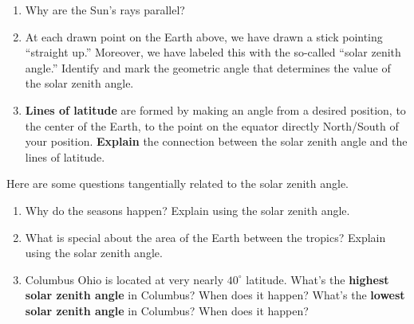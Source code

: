\documentclass[noauthor,nooutcomes,handout,hints,12pt]{ximera}
\begin{document}
\begin{question}
\begin{center}
  \end{center}
  \begin{enumerate}
  \item Why are the Sun's rays parallel?
  \item At each drawn point on the Earth above, we have drawn a stick
    pointing ``straight up.'' Moreover, we have labeled this with the
    so-called ``solar zenith angle.'' Identify and mark the geometric
    angle that determines the value of the solar zenith angle.
  \item \textbf{Lines of latitude} are formed by making an angle from
    a desired position, to the center of the Earth, to the point on
    the equator directly North/South of your position. \textbf{Explain}
    the connection between the solar zenith angle and the lines of latitude.
  \end{enumerate}
 
\end{question}
\mynewpage




\begin{question}
  Here are some questions tangentially related to the solar zenith angle.
  \begin{enumerate}
  \item Why do the seasons happen? Explain using the solar zenith angle.
  \item What is special about the area of the Earth between the tropics? Explain using the solar zenith angle.
  \item Columbus Ohio is located at very nearly $40^\circ$
    latitude. What's the \textbf{highest solar zenith angle} in
    Columbus? When does it happen? What's the \textbf{lowest
      solar zenith angle} in Columbus? When does it happen?
  \end{enumerate}
\end{question}
\end{document}
